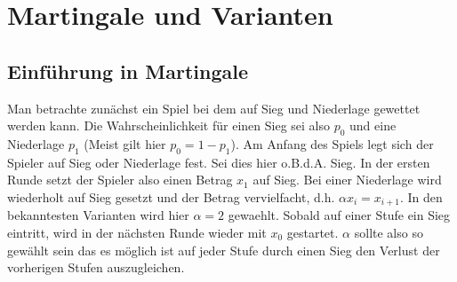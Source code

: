 \documentclass[11pt]{scrartcl}
\begin{document}
	\section{Martingale und Varianten}
		\subsection{Einführung in Martingale}
			Man betrachte zunächst ein Spiel bei dem auf Sieg und Niederlage gewettet werden kann. Die Wahrscheinlichkeit für einen Sieg sei also \(p_{0}\) und eine Niederlage \(p_{1}\) (Meist gilt hier \(p_{0} = 1-p_{1}\)). Am Anfang des Spiels legt sich der Spieler auf Sieg oder Niederlage fest. Sei dies hier o.B.d.A. Sieg. In der ersten Runde setzt der Spieler also einen Betrag \(x_{1}\)  auf Sieg. Bei einer Niederlage wird wiederholt auf Sieg gesetzt und der Betrag vervielfacht, d.h. \(\alpha x_{i} = x_{i+1}\). In den bekanntesten Varianten wird hier \(\alpha = 2\) gewaehlt. Sobald auf einer Stufe ein Sieg eintritt, wird in der nächsten Runde wieder mit \(x_{0}\) gestartet. \(\alpha\) sollte also so gewählt sein das es möglich ist auf jeder Stufe durch einen Sieg den Verlust der vorherigen Stufen auszugleichen.
\end{document}

